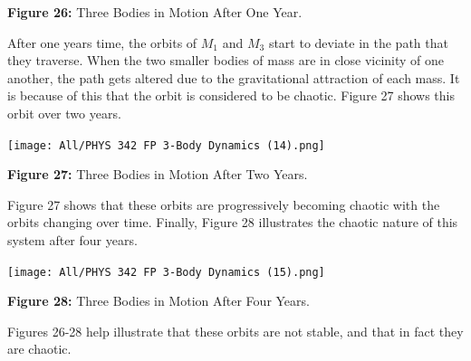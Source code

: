\documentclass[]{article}
\begin{document}
\begin{multicols}{2}
\begin{center}
\caption{\small{\textbf{Figure 26:}} \tiny{Three Bodies in Motion After One Year.}}
\end{center}
After one years time, the orbits of $M_1$ and $M_3$ start to deviate in the path that they traverse. When the two smaller bodies of mass are in close vicinity of one another, the path gets altered due to the gravitational attraction of each mass. It is because of this that the orbit is considered to be chaotic. Figure 27 shows this orbit over two years.
\begin{center}
\texttt{[image: All/PHYS 342 FP 3-Body Dynamics (14).png]}
\caption{\small{\textbf{Figure 27:}} \tiny{Three Bodies in Motion After Two Years.}}
\end{center}
Figure 27 shows that these orbits are progressively becoming chaotic with the orbits changing over time. Finally, Figure 28 illustrates the chaotic nature of this system after four years.
\begin{center}
\texttt{[image: All/PHYS 342 FP 3-Body Dynamics (15).png]}
\caption{\small{\textbf{Figure 28:}} \tiny{Three Bodies in Motion After Four Years.}}
\end{center}
Figures 26-28 help illustrate that these orbits are not stable, and that in fact they are chaotic.
\par
\end{multicols}
\end{document}
